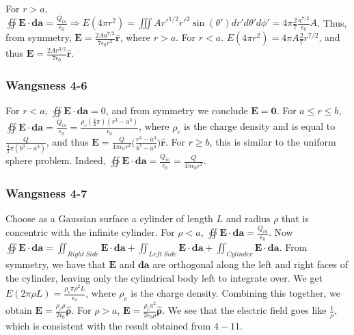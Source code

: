 \documentclass[oneside]{book}
\theoremstyle{definition}
\newcommand*\B[1]{\mathbf{#1}}
\newcommand*\Bh[1]{\mathbf{\hat{#1}}}
\begin{document}
For $r>a$, $\oiint \B{E}\cdot \B{da} = \frac{Q_{in}}{\epsilon_0} \Rightarrow E(4\pi r^2) = \iiint A r'^{1/2}r'^2 \sin(\theta ')dr'd\theta'd\phi' = 4\pi \frac{2}{7}\frac{a^{7/2}}{\epsilon_0}A$. Thus, from symmetry, $\B{E} = \frac{2A a^{7/2}}{7 \epsilon_0 r^2}\Bh{r}$, where $r>a$. For $r<a$. $E(4\pi r^2) = 4\pi A \frac{2}{7}r^{7/2}$, and thus $\B{E} = \frac{2Ar^{3/2}}{7\epsilon_0}\Bh{r}$. 

\begin{figure}[!h]
  \centering
  \hfill
\end{figure}

\subsubsection{Wangsness 4-6}

For $r<a$, $\oiint\B{E} \cdot \B{da} = 0$, and from symmetry we conclude $\B{E} = \B{0}$. For $a\leq r \leq b$, $\oiint \B{E}\cdot \B{da} = \frac{Q_{in}}{\epsilon_0} = \frac{\rho_c(\frac{4}{3}\pi)(r^3-a^3)}{\epsilon_0}$, where $\rho_c$ is the charge density and is equal to $\frac{Q}{\frac{4}{3}\pi(b^3-a^3)}$, and thus $\B{E} = \frac{Q}{4\pi \epsilon_0 r^2}\bigg(\frac{r^3-a^3}{b^3-a^3}\bigg)\Bh{r}$. For $r\geq b$, this is similar to the uniform sphere problem. Indeed, $\oiint \B{E}\cdot \B{da} = \frac{Q_{in}}{\epsilon_0} = \frac{Q}{4\pi \epsilon_0 r^2}$. 

\subsubsection{Wangsness 4-7}
Choose as a Gaussian surface a cylinder of length $L$ and radius $\rho$ that is concentric with the infinite cylinder. For $\rho<a$, $\oiint \B{E}\cdot \B{da} = \frac{Q_{in}}{\epsilon_0}$. Now $\oiint \B{E} \cdot \B{da} = \iint_{Right\ Side} \B{E}\cdot \B{da} + \iint_{Left\ Side}\B{E}\cdot \B{da} + \iint_{Cylinder} \B{E}\cdot \B{da}$. From symmetry, we have that $\B{E}$ and $\B{da}$ are orthogonal along the left and right faces of the cylinder, leaving only the cylindrical body left to integrate over. We get $E(2\pi \rho L) = \frac{\rho_c \pi \rho^2 L}{\epsilon_0}$, where $\rho_c$ is the charge density. Combining this together, we obtain $\B{E} = \frac{\rho_c \rho}{2\epsilon_0} \Bh{\rho}$. For $\rho>a$, $\B{E} = \frac{\rho_{c} a^2}{2\epsilon_0 \rho}\Bh{\rho}$. We see that the electric field goes like $\frac{1}{\rho}$, which is consistent with the result obtained from $4-11$.
\end{document}
